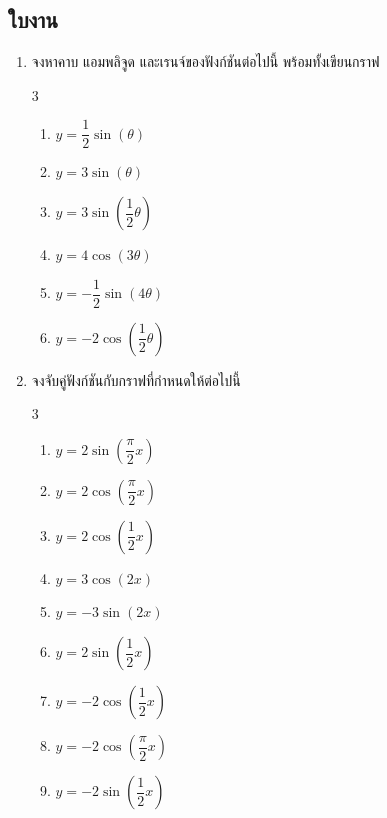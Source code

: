 \subsection*{ใบงาน}
\begin{enumerate}[label=\arabic*., leftmargin=*, itemsep=1em]
	\item จงหาคาบ แอมพลิจูด และเรนจ์ของฟังก์ชันต่อไปนี้ พร้อมทั้งเขียนกราฟ
	\begin{multicols}{3}
		\begin{enumerate}[label=\theenumi\arabic*), leftmargin=1.5em, itemsep=0.6em]
			\everymath{\displaystyle}
			\item $y = \dfrac{1}{2} \sin \left( \theta \right)$
			\item $y = 3 \sin \left( \theta \right)$
			\item $y = 3 \sin \left( \dfrac{1}{2} \theta \right)$
			\item $y = 4 \cos \left( 3 \theta \right)$
			\item $y = -\dfrac{1}{2} \sin \left( 4 \theta \right)$
			\item $y = -2 \cos \left( \dfrac{1}{2} \theta \right)$
		\end{enumerate}
	\end{multicols}
	\item จงจับคู่ฟังก์ชันกับกราฟที่กำหนดให้ต่อไปนี้
	\begin{multicols}{3}
		\begin{enumerate}[label=\theenumi\arabic*), leftmargin=1.5em, itemsep=0.6em]
			\everymath{\displaystyle}
			\item $y = 2 \sin \left( \dfrac{\pi}{2} x \right)$
			\item $y = 2 \cos \left( \dfrac{\pi}{2} x \right)$
			\item $y = 2 \cos \left( \dfrac{1}{2} x \right)$
			\item $y = 3 \cos \left( 2x \right)$
			\item $y = -3 \sin \left( 2x \right)$
			\item $y = 2 \sin \left( \dfrac{1}{2} x \right)$
			\item $y = -2 \cos \left( \dfrac{1}{2} x \right)$
			\item $y = -2 \cos \left( \dfrac{\pi}{2} x \right)$
			\item $y = -2 \sin \left( \dfrac{1}{2} x \right)$
		\end{enumerate}
	\end{multicols}
\end{enumerate}

